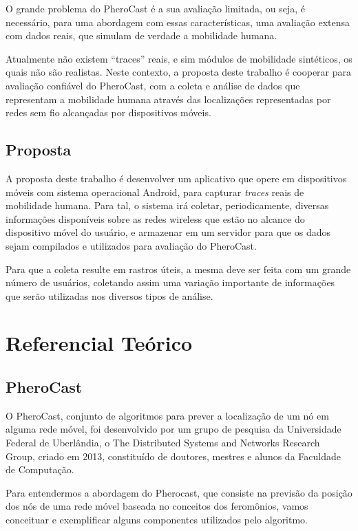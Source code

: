 \documentclass[12pt, %
openright, 
oneside,
a4paper,
brazil]{facom-ufu-abntex2}
\begin{document}
O grande problema do PheroCast é a sua avaliação limitada, ou seja, é necessário, para uma abordagem com essas características, uma avaliação extensa com dados reais, que simulam de verdade a mobilidade humana. 

Atualmente não existem ``traces'' reais, e sim módulos de mobilidade sintéticos, os quais não são realistas. Neste contexto, a proposta deste trabalho é cooperar para avaliação confiável do PheroCast, com a coleta e análise de dados que representam a mobilidade humana através das localizações representadas por redes sem fio alcançadas por dispositivos móveis.

\section{Proposta}
A proposta deste trabalho é desenvolver um aplicativo que opere em dispositivos móveis com sistema operacional Android, para capturar \emph{traces} reais de mobilidade humana. Para tal, o sistema irá coletar, periodicamente, diversas informações disponíveis sobre as redes wireless que estão no alcance do dispositivo móvel do usuário, e armazenar em um servidor para que os dados sejam compilados e utilizados para avaliação do PheroCast.

Para que a coleta resulte em rastros úteis, a mesma deve ser feita com um grande número de usuários, coletando assim uma variação importante de informações que serão utilizadas nos diversos tipos de análise. 


\chapter{Referencial Teórico}
\section{PheroCast}

	O PheroCast, conjunto de algoritmos para prever a localização de um nó em alguma rede móvel, foi desenvolvido por um grupo de pesquisa da Universidade Federal de Uberlândia, o The Distributed Systems and Networks  Research Group, criado em 2013, constituído de doutores, mestres e alunos da Faculdade de Computação. \cite{6838650} 
	
	
	Para entendermos a abordagem do Pherocast, que consiste na previsão da posição dos nós de uma rede móvel baseada no conceitos dos feromônios, vamos conceituar e exemplificar alguns componentes utilizados pelo algoritmo.
\end{document}
